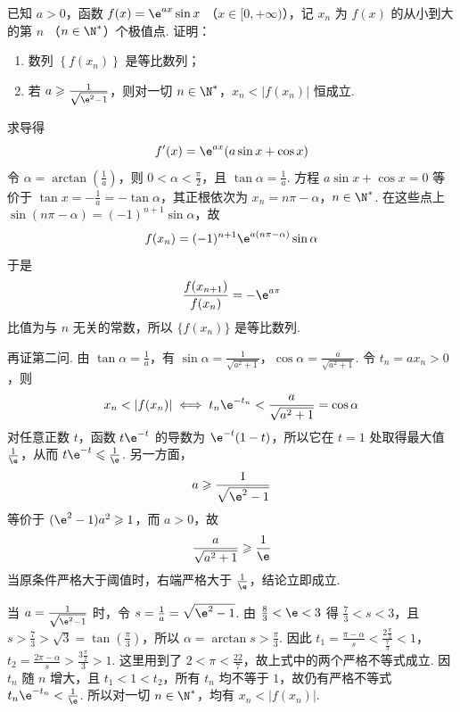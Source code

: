 \begin{problem}
已知 \(a > 0\)，函数 \(f(x) = \e^{ax}\sin x\) （\(x \in [0, +\infty)\)），记 \(x_n\) 为 \(f(x)\) 的从小到大的第 \(n\) （\(n \in \N^*\)）个极值点. 证明：

\begin{enumerate}
\item 数列 \( \left\{f(x_{n})\right\} \) 是等比数列；
\item 若 \(a \geqslant \frac{1}{\sqrt{\e^{2} - 1}}\)，则对一切 \(n \in \N^*\)，\(x_n < |f(x_n)|\) 恒成立.
\end{enumerate}
\end{problem}

\begin{solution}
求导得
\[
f'(x)=\e^{ax}(a\sin x+\cos x)
\]
令 \(\alpha=\arctan(\frac{1}{a})\)，则 \(0<\alpha<\frac{\pi}{2}\)，且 \(\tan\alpha=\frac{1}{a}\). 方程 \(a\sin x+\cos x=0\) 等价于 \(\tan x=-\frac{1}{a}=-\tan\alpha\)，其正根依次为
\(x_n=n\pi-\alpha\)，\(n\in\N^*\).
在这些点上 \(\sin(n\pi-\alpha)=(-1)^{n+1}\sin\alpha\)，故
\[
f(x_n)=(-1)^{n+1}\e^{a(n\pi-\alpha)}\sin\alpha
\]
于是
\[
\frac{f(x_{n+1})}{f(x_n)}=-\e^{a\pi}
\]
比值为与 \(n\) 无关的常数，所以 \(\{f(x_n)\}\) 是等比数列.

再证第二问. 由 \(\tan\alpha=\frac{1}{a}\)，有
\(\sin\alpha=\frac{1}{\sqrt{a^2+1}}\)，\(\cos\alpha=\frac{a}{\sqrt{a^2+1}}\).
令 \(t_n=ax_n>0\)，则
\[
x_n<|f(x_n)|
\iff t_n\e^{-t_n}<\frac{a}{\sqrt{a^2+1}}=\cos\alpha
\]
对任意正数 \(t\)，函数 \(t\e^{-t}\) 的导数为 \(\e^{-t}(1-t)\)，所以它在 \(t=1\) 处取得最大值 \(\frac{1}{\e}\)，从而 \(t\e^{-t}\leqslant\frac{1}{\e}\). 另一方面，
\[
a\geqslant\frac{1}{\sqrt{\e^2-1}}
\]
等价于 \((\e^2-1)a^2\geqslant1\)，而 \(a>0\)，故
\[
\frac{a}{\sqrt{a^2+1}}\geqslant\frac1\e
\]
当原条件严格大于阈值时，右端严格大于 \(\frac{1}{\e}\)，结论立即成立.

当 \(a=\frac{1}{\sqrt{\e^2-1}}\) 时，令 \(s=\frac{1}{a}=\sqrt{\e^2-1}\). 由 \(\frac{8}{3}<\e<3\) 得 \(\frac{7}{3}<s<3\)，且 \(s>\frac{7}{3}>\sqrt3=\tan(\frac{\pi}{3})\)，所以 \(\alpha=\arctan s>\frac{\pi}{3}\). 因此
\(t_1=\frac{\pi-\alpha}{s}<\frac{2\frac{\pi}{3}}{\frac{7}{3}}<1\)，\(t_2=\frac{2\pi-\alpha}{s}>\frac{3\frac{\pi}{2}}{3}>1\).
这里用到了 \(2<\pi<\frac{22}{7}\)，故上式中的两个严格不等式成立. 因 \(t_n\) 随 \(n\) 增大，且 \(t_1<1<t_2\)，所有 \(t_n\) 均不等于 \(1\)，故仍有严格不等式 \(t_n\e^{-t_n}<\frac{1}{\e}\). 所以对一切 \(n\in\N^*\)，均有 \(x_n<|f(x_n)|\).
\end{solution}
